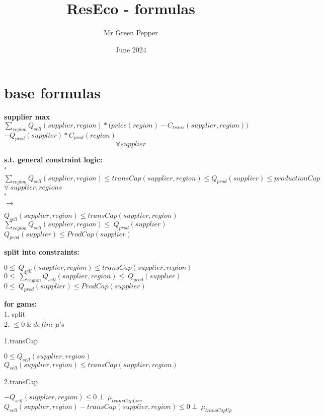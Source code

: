 \documentclass{article}
\title{ResEco - formulas}
\author{Mr Green Pepper}
\date{June 2024}
\begin{document}
\maketitle

\section{base formulas}
\textbf{supplier max}
\(\sum_{region} Q_{sell}(supplier, region) *\Big(price(region) - C_{trans}(supplier,region)\Big) \)\\
\tab\tab\(- Q_{prod}(supplier)*C_{prod}(region)\) $$\forall supplier$$

\textbf{s.t. general constraint logic:}\\
"\\
$\sum_{region} Q_{sell}(supplier, region) \leq transCap(supplier, region) \leq Q_{prod}(supplier) \leq productionCap$ \\
$\forall \: supplier,regions$\\
"\\
$\rightarrow$
\begin{center}
	\(Q_{sell}(supplier, region) \leq transCap(supplier, region)\)
	\(\sum_{region} Q_{sell}(supplier, region) \leq\ Q_{prod}(supplier) \)
	\(Q_{prod}(supplier) \leq ProdCap(supplier)\)
\end{center}

\textbf{split into constraints:}\\

\begin{center}
\(0 \leq\ Q_{sell}(supplier, region) \leq transCap(supplier, region)\)
\(0 \leq\ \sum_{region} Q_{sell}(supplier, region) \leq\ Q_{prod}(supplier) \)
\(0 \leq\ Q_{prod}(supplier) \leq ProdCap(supplier)\)
\end{center}


\textbf{for gams:}\\
1. split\\
2. $\leq 0 \: \& \: define \:\mu$'s

1.transCap
\begin{center}
 	\(0 \leq Q_{sell}(supplier, region)\)
	\(Q_{sell}(supplier, region) \leq transCap(supplier, region)\)
\end{center}
2.transCap
\begin{center}
	\(- Q_{sell}(supplier, region) \leq 0  \perp\: \mu_{transCapLow}\)\\
	\(Q_{sell}(supplier, region) - transCap(supplier, region) \leq 0  \perp\: \mu_{transCapUp}\)\\
\end{center}
\end{document}
